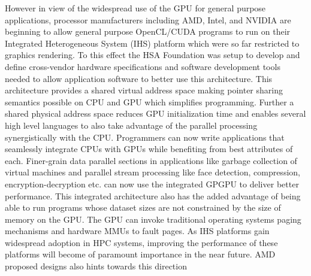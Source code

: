 \par However in view of the widespread use of the GPU for general purpose applications, processor manufacturers including AMD\cite{amd-apu}, Intel\cite{inteliris}, and NVIDIA\cite{denver} are beginning to allow general purpose OpenCL/CUDA programs to run on their Integrated Heterogeneous System (IHS) platform which were so far restricted to graphics rendering. To this effect the HSA Foundation \cite{hsafoundation} was setup to develop and define cross-vendor hardware specifications and software development tools needed to allow application software to better use this architecture. This architecture provides a shared virtual address space making pointer sharing semantics possible on CPU and GPU which simplifies programming. Further a shared physical address space reduces GPU initialization time and enables several high level languages to also take advantage of the parallel processing synergistically with the CPU. Programmers can now write applications that seamlessly integrate CPUs with GPUs while benefiting from best attributes of each. Finer-grain data parallel sections in applications like garbage collection \cite{sumatra} of virtual machines and parallel stream processing like face detection, compression, encryption-decryption etc. can now use the integrated GPGPU to deliver better performance. This integrated architecture also has the added advantage of being able to run programs whose dataset sizes are not constrained by the size of memory on the GPU. The GPU can invoke traditional operating systems paging mechanisms and hardware MMUs to fault pages. As IHS platforms gain widespread adoption in HPC systems, improving the performance of these platforms will become of paramount importance in the near future. AMD proposed designs also hints towards this direction \cite{apu-exascale}
